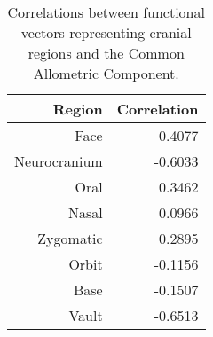 \begin{table}[ht]
  \centering
  \caption{Correlations between functional vectors representing cranial regions and the Common Allometric Component. \label{tab:cac_dir}}
  \begin{tabular}{rr}
    \toprule
    Region & Correlation \\ 
    \midrule
    Face & 0.4077 \\          
    Neurocranium & -0.6033 \\ 
    Oral & 0.3462 \\ 
    Nasal & 0.0966 \\ 
    Zygomatic & 0.2895 \\ 
    Orbit & -0.1156 \\ 
    Base & -0.1507 \\ 
    Vault & -0.6513 \\ 
    \bottomrule
  \end{tabular}
\end{table}